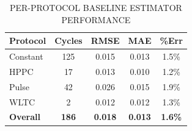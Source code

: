 \begin{table}[H]
    \caption{PER-PROTOCOL BASELINE ESTIMATOR PERFORMANCE}
    \label{tab:pfi_baseline}
    \begin{center}
        \footnotesize
        \begin{tabular}{lcccc}
            \hline
            \textbf{Protocol} & \textbf{Cycles} & \textbf{RMSE} & \textbf{MAE} & \textbf{\%Err} \\
            \hline
            Constant & 125 & 0.015 & 0.013 & 1.5\% \\
            HPPC & 17 & 0.013 & 0.010 & 1.2\% \\
            Pulse & 42 & 0.026 & 0.015 & 1.9\% \\
            WLTC & 2 & 0.012 & 0.012 & 1.3\% \\
            \hline
            \textbf{Overall} & \textbf{186} & \textbf{0.018} & \textbf{0.013} & \textbf{1.6\%} \\
            \hline
        \end{tabular}
    \end{center}
\end{table}

